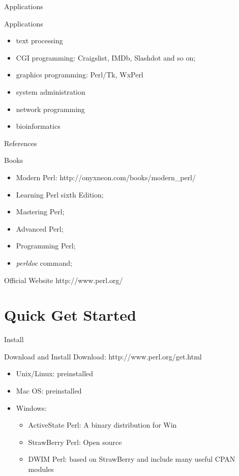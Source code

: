 \documentclass[UTF8]{beamer}
\begin{document}
\begin{frame}[t]{Applications}
\begin{block}{Applications}
  \begin{itemize}
    \item text processing
    \item CGI programming: Craigslist, IMDb, Slashdot and so on;
    \item graphics programming: Perl/Tk, WxPerl
    \item system administration
    \item network programming
    \item bioinformatics
  \end{itemize}
\end{block}
\end{frame}

\begin{frame}[t]{References}
\begin{block}{Books}
  \begin{itemize}
    \item Modern Perl: http://onyxneon.com/books/modern_perl/
    \item Learning Perl sixth Edition;
    \item Mastering Perl;
    \item Advanced Perl;
    \item Programming Perl;
    \item \textit{perldoc} command;
  \end{itemize}
\end{block}
\begin{block}{Official Website}
  http://www.perl.org/
\end{block}
\end{frame}

\section{Quick Get Started}

\begin{frame}[t]{Install}
\begin{block}{Download and Install}
  Download: http://www.perl.org/get.html
  \begin{itemize}
    \item Unix/Linux: preinstalled
    \item Mac OS: preinstalled
    \item Windows:
    \begin{itemize}
      \item ActiveState Perl: A binary distribution for Win
      \item StrawBerry Perl: Open source
      \item DWIM Perl: based on StrawBerry and include many useful CPAN modules
    \end{itemize}
  \end{itemize}
\end{block}
\end{frame}
\end{document}
